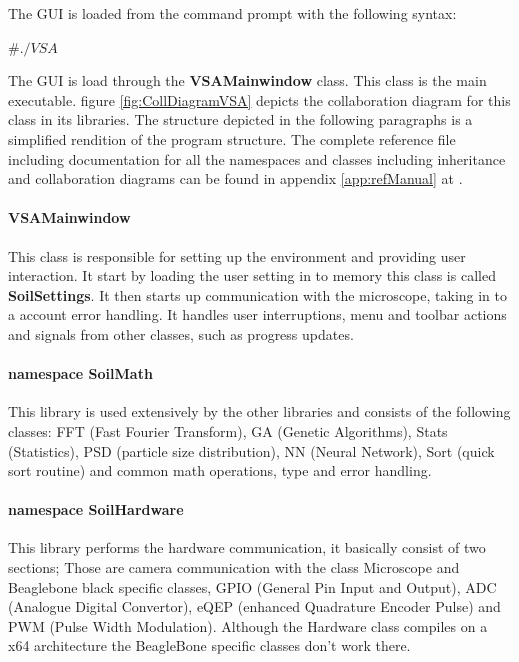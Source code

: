 \documentclass[11pt,fleqn,,a4paper,twoside,openright]{book}
\begin{document}
The GUI is loaded from the command prompt with the following syntax:
\begin{sBox}
	$\# ./VSA $
\end{sBox}

The GUI is load through the \textbf{VSAMainwindow} class. This class is the main executable. figure \ref{fig:CollDiagramVSA} depicts the collaboration diagram for this class in its libraries. The structure depicted in the following paragraphs is a simplified rendition of the program structure. The complete reference file including documentation for all the namespaces and classes including inheritance and collaboration diagrams can be found in appendix \ref{app:refManual} at \pageref{app:refManual}.

\paragraph{VSAMainwindow}
This class is responsible for setting up the environment and providing user interaction. It start by loading the user setting in to memory this class is called \textbf{SoilSettings}. It then starts up communication with the microscope, taking in to a account error handling. It handles user interruptions, menu and toolbar actions and signals from other classes, such as progress updates. 

\paragraph{namespace SoilMath}
This library is used extensively by the other libraries and consists of the following classes: FFT (Fast Fourier Transform), GA (Genetic Algorithms), Stats (Statistics), PSD (particle size distribution), NN (Neural Network), Sort (quick sort routine) and common math operations, type and error handling.

\paragraph{namespace SoilHardware}
This library performs the hardware communication, it basically consist of two sections; Those are camera communication with the class Microscope and Beaglebone black specific classes, GPIO (General Pin Input and Output), ADC (Analogue Digital Convertor), eQEP (enhanced Quadrature Encoder Pulse) and PWM (Pulse Width Modulation). Although the Hardware class compiles on a x64 architecture the BeagleBone specific classes don't work there.
\end{document}
